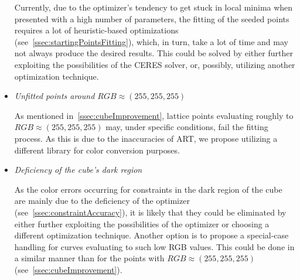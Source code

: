 \begin{itemize}
	Currently, due to the optimizer's tendency to get stuck in local minima when presented with a high number of parameters, the fitting of the seeded points requires a lot of heuristic-based optimizations (see~\cref{ssec:startingPointsFitting}), which, in turn, take a lot of time and may not always produce the desired results. This could be solved by either further exploiting the possibilities of the CERES solver, or, possibly, utilizing another optimization technique.

	\item{\emph{Unfitted points around $RGB\approx(255, 255, 255)$}}
	
	As mentioned in~\cref{ssec:cubeImprovement}, lattice points evaluating roughly to $RGB\approx(255, 255, 255)$ may, under specific conditions, fail the fitting process. As this is due to the inaccuracies of ART, we propose utilizing a different library for color conversion purposes.
	
	\item{\emph{Deficiency of the cube's dark region}}
	
	As the color errors occurring for constraints in the dark region of the cube are mainly due to the deficiency of the optimizer (see~\cref{ssec:constraintAccuracy}), it is likely that they could be eliminated by either further exploiting the possibilities of the optimizer or choosing a different optimization technique. Another option is to propose a special-case handling for curves evaluating to such low RGB values. This could be done in a similar manner than for the points with $RGB\approx(255, 255, 255)$ (see~\cref{ssec:cubeImprovement}).
	
	
\end{itemize}